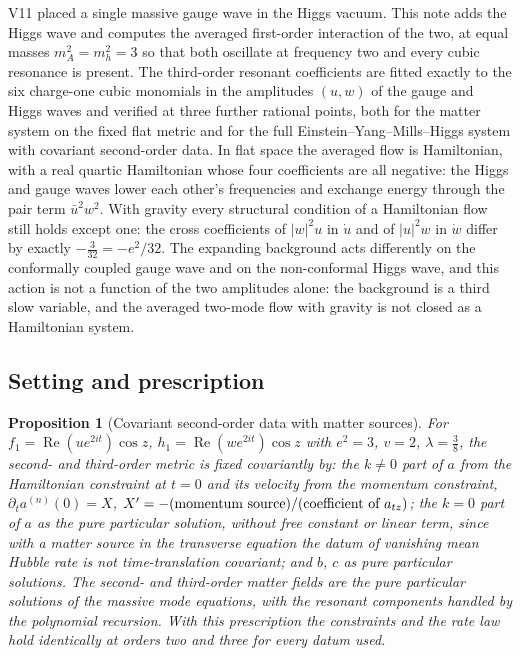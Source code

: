 \documentclass[11pt]{article}
\newtheorem{proposition}[theorem]{Proposition}
\theoremstyle{remark}
\begin{document}
V11 placed a single massive gauge wave in the Higgs vacuum.  This
note adds the Higgs wave and computes the averaged first-order
interaction of the two, at equal masses \(m_A^2=m_h^2=3\) so that
both oscillate at frequency two and every cubic resonance is present.
The third-order resonant coefficients are fitted exactly to the six
charge-one cubic monomials in the amplitudes \((u,w)\) of the gauge
and Higgs waves and verified at three further rational points, both
for the matter system on the fixed flat metric and for the full
Einstein--Yang--Mills--Higgs system with covariant second-order data.
In flat space the averaged flow is Hamiltonian, with a real quartic
Hamiltonian whose four coefficients are all negative: the Higgs and
gauge waves lower each other's frequencies and exchange energy
through the pair term \(\bar u^2w^2\).  With gravity every structural
condition of a Hamiltonian flow still holds except one: the cross
coefficients of \(|w|^2u\) in \(\dot u\) and of \(|u|^2w\) in \(\dot w\)
differ by exactly \(-\tfrac3{32}=-e^2/32\).  The expanding background
acts differently on the conformally coupled gauge wave and on the
non-conformal Higgs wave, and this action is not a function of the
two amplitudes alone: the background is a third slow variable, and
the averaged two-mode flow with gravity is not closed as a
Hamiltonian system.

\subsection{Setting and prescription}

\begin{proposition}[Covariant second-order data with matter sources]
\label{prop:v20v12-prescription}
For \(f_1=\operatorname{Re}(ue^{2it})\cos z\), \(h_1=\operatorname{Re}(we^{2it})\cos z\)
with \(e^2=3\), \(v=2\), \(\lambda=\tfrac38\), the second- and third-order
metric is fixed covariantly by: the \(k\neq0\) part of \(a\) from the
Hamiltonian constraint at \(t=0\) and its velocity from the momentum
constraint, \(\partial_ta^{(n)}(0)=X\), \(X'=-(\hbox{momentum source})/(\hbox{coefficient of }a_{tz})\);
the \(k=0\) part of \(a\) as the pure particular solution, without free
constant or linear term, since with a matter source in the transverse
equation the datum of vanishing mean Hubble rate is not
time-translation covariant; and \(b\), \(c\) as pure particular
solutions.  The second- and third-order matter fields are the pure
particular solutions of the massive mode equations, with the resonant
components handled by the polynomial recursion.  With this
prescription the constraints and the rate law hold identically at
orders two and three for every datum used.
\end{proposition}
\end{document}
